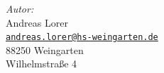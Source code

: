 \begin{titlepage}
\begin{center}
    \begin{flushleft}\large
	  \hspace*{2cm} \emph{Autor:}\\
	  \hspace*{2cm} Andreas Lorer\\
	  \hspace*{2cm} \href{mailto:andreas.lorer@hs-weingarten.de}{\nolinkurl{andreas.lorer@hs-weingarten.de} }\\
      \hspace*{2cm} 88250 Weingarten\\
      \hspace*{2cm} Wilhelmstraße 4
    \end{flushleft}
   \end{center}
   \vfill
\end{titlepage}
